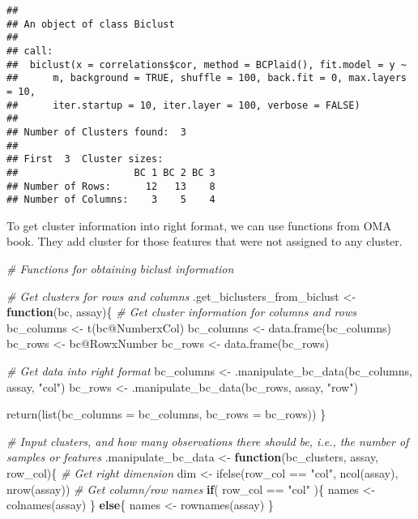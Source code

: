 \documentclass[
  oneside]{book}
\newenvironment{Shaded}{\begin{snugshade}}{\end{snugshade}}
\newcommand{\AttributeTok}[1]{\textcolor[rgb]{0.77,0.63,0.00}{#1}}
\newcommand{\CommentTok}[1]{\textcolor[rgb]{0.56,0.35,0.01}{\textit{#1}}}
\newcommand{\ControlFlowTok}[1]{\textcolor[rgb]{0.13,0.29,0.53}{\textbf{#1}}}
\newcommand{\FunctionTok}[1]{\textcolor[rgb]{0.00,0.00,0.00}{#1}}
\newcommand{\NormalTok}[1]{#1}
\newcommand{\OtherTok}[1]{\textcolor[rgb]{0.56,0.35,0.01}{#1}}
\newcommand{\SpecialCharTok}[1]{\textcolor[rgb]{0.00,0.00,0.00}{#1}}
\newcommand{\StringTok}[1]{\textcolor[rgb]{0.31,0.60,0.02}{#1}}
\begin{document}
\begin{verbatim}
## 
## An object of class Biclust 
## 
## call:
##  biclust(x = correlations$cor, method = BCPlaid(), fit.model = y ~ 
##      m, background = TRUE, shuffle = 100, back.fit = 0, max.layers = 10, 
##      iter.startup = 10, iter.layer = 100, verbose = FALSE)
## 
## Number of Clusters found:  3 
## 
## First  3  Cluster sizes:
##                    BC 1 BC 2 BC 3
## Number of Rows:      12   13    8
## Number of Columns:    3    5    4
\end{verbatim}

To get cluster information into right format, we can use functions from OMA book.
They add cluster for those features that were not assigned to any cluster.

\begin{Shaded}
\begin{Highlighting}[]
\CommentTok{\# Functions for obtaining biclust information}

\CommentTok{\# Get clusters for rows and columns}
\NormalTok{.get\_biclusters\_from\_biclust }\OtherTok{\textless{}{-}} \ControlFlowTok{function}\NormalTok{(bc, assay)\{}
  \CommentTok{\# Get cluster information for columns and rows}
\NormalTok{  bc\_columns }\OtherTok{\textless{}{-}} \FunctionTok{t}\NormalTok{(bc}\SpecialCharTok{@}\NormalTok{NumberxCol)}
\NormalTok{  bc\_columns }\OtherTok{\textless{}{-}} \FunctionTok{data.frame}\NormalTok{(bc\_columns)}
\NormalTok{  bc\_rows }\OtherTok{\textless{}{-}}\NormalTok{ bc}\SpecialCharTok{@}\NormalTok{RowxNumber}
\NormalTok{  bc\_rows }\OtherTok{\textless{}{-}} \FunctionTok{data.frame}\NormalTok{(bc\_rows)}
  
  \CommentTok{\# Get data into right format}
\NormalTok{  bc\_columns }\OtherTok{\textless{}{-}} \FunctionTok{.manipulate\_bc\_data}\NormalTok{(bc\_columns, assay, }\StringTok{"col"}\NormalTok{)}
\NormalTok{  bc\_rows }\OtherTok{\textless{}{-}} \FunctionTok{.manipulate\_bc\_data}\NormalTok{(bc\_rows, assay, }\StringTok{"row"}\NormalTok{)}
  
  \FunctionTok{return}\NormalTok{(}\FunctionTok{list}\NormalTok{(}\AttributeTok{bc\_columns =}\NormalTok{ bc\_columns, }\AttributeTok{bc\_rows =}\NormalTok{ bc\_rows))}
\NormalTok{\}}

\CommentTok{\# Input clusters, and how many observations there should be, i.e., the number of samples or features}
\NormalTok{.manipulate\_bc\_data }\OtherTok{\textless{}{-}} \ControlFlowTok{function}\NormalTok{(bc\_clusters, assay, row\_col)\{}
  \CommentTok{\# Get right dimension}
\NormalTok{  dim }\OtherTok{\textless{}{-}} \FunctionTok{ifelse}\NormalTok{(row\_col }\SpecialCharTok{==} \StringTok{"col"}\NormalTok{, }\FunctionTok{ncol}\NormalTok{(assay), }\FunctionTok{nrow}\NormalTok{(assay))}
  \CommentTok{\# Get column/row names}
  \ControlFlowTok{if}\NormalTok{( row\_col }\SpecialCharTok{==} \StringTok{"col"}\NormalTok{ )\{}
\NormalTok{    names }\OtherTok{\textless{}{-}} \FunctionTok{colnames}\NormalTok{(assay)}
\NormalTok{  \} }\ControlFlowTok{else}\NormalTok{\{}
\NormalTok{    names }\OtherTok{\textless{}{-}} \FunctionTok{rownames}\NormalTok{(assay)}
\NormalTok{  \}}
  

\end{Highlighting}
\end{Shaded}
\end{document}
